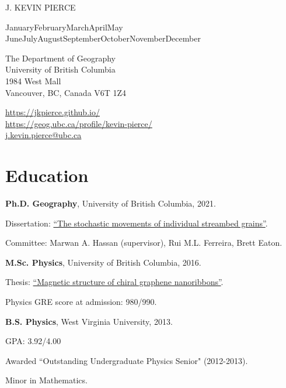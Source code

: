 \documentclass[11pt,letterpaper]{article}
\def\name{J. Kevin Pierce}
\newcommand{\titlefont}[1]{{\titleface\Large\MakeUppercase{#1}}}
\renewenvironment{itemize}{
	\begin{list}{}{
			\setlength{\leftmargin}{1.5em}
			\setlength{\rightmargin}{0em}  %
			\setlength{\itemsep}{0.25em}
			\setlength{\parskip}{0pt}
			\setlength{\parsep}{0.25em}
		}
	}{
	\end{list}
}
\renewenvironment{itemize}{
	\begin{list}{}{
			\setlength{\leftmargin}{1.5em}
			\setlength{\itemsep}{0.25em}
			\setlength{\parskip}{0pt}
			\setlength{\parsep}{0.25em}
		}
	}{
	\end{list}
}
\renewcommand{\today}{\ifcase \month \or January\or February\or March\or April\or May%
	\or June\or July\or August\or September\or October\or November\or December\fi%
	\space \number \year}
\begin{document}
	
	\titlefont{\name}
	
	
	\bigskip
	\today
	
	\bigskip
	\begin{minipage}[t]{0.495\textwidth}
		The Department of Geography \\
		University of British Columbia \\
		1984 West Mall \\
		Vancouver, BC, Canada  V6T 1Z4
	\end{minipage}
	\begin{minipage}[t]{0.495\textwidth}
		\href{https://jkpierce.github.io/}{https://jkpierce.github.io/} \\
		\href{https://geog.ubc.ca/profile/kevin-pierce/}{https://geog.ubc.ca/profile/kevin-pierce/}\\
		\href{mailto:j.kevin.pierce@ubc.ca}{j.kevin.pierce@ubc.ca}
	\end{minipage}
	
	\section*{Education}
	
	\begin{itemize}
		\item {\bf Ph.D. Geography}, University of British Columbia, 2021.
		\begin{itemize}
			\item Dissertation: \href{https://open.library.ubc.ca/soa/cIRcle/collections/ubctheses/24/items/1.0402359}{``The stochastic movements of individual streambed grains''}.
			\item Committee: Marwan A. Hassan (supervisor), Rui M.L. Ferreira, Brett Eaton.
		\end{itemize}
		\item {\bf M.Sc. Physics}, University of British Columbia, 2016.
		\begin{itemize}
			\item Thesis: \href{https://open.library.ubc.ca/soa/cIRcle/collections/ubctheses/24/items/1.0300170}{``Magnetic structure of chiral graphene nanoribbons''}.
			\item Physics GRE score at admission: 980/990.
		\end{itemize}
		\item {\bf B.S. Physics},
		West Virginia University, 2013.
		\begin{itemize}
			\item GPA: 3.92/4.00
			\item Awarded ``Outstanding Undergraduate Physics Senior" (2012-2013).
			\item Minor in Mathematics.
		\end{itemize}
	\end{itemize}
	
\end{document}
